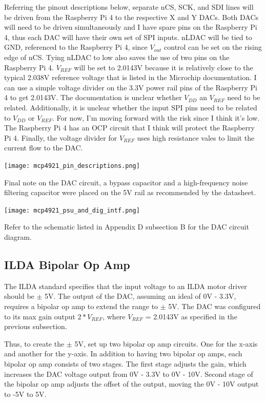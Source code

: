 \documentclass[journal]{IEEEtran}
\begin{document}
    Referring the pinout descriptions below, separate nCS, SCK, and SDI lines will be driven from the Raspberry Pi 4 to the respective X and Y DACs.
    Both DACs will need to be driven simultaneously and I have spare pins on the Raspberry Pi 4, thus each DAC will have their own set of SPI inputs.
    nLDAC will be tied to GND, referenced to the Raspberry Pi 4, since $V_{out}$ control can be set on the rising edge of nCS.
    Tying nLDAC to low also saves the use of two pins on the Raspberry Pi 4.
    $V_{REF}$ will be set to 2.0143V because it is relatively close to the typical 2.038V reference voltage that is listed in the Microchip documentation.
    I can use a simple voltage divider on the 3.3V power rail pins of the Raspberry Pi 4 to get 2.0143V.
    The documentation is unclear whether $V_{DD}$ an $V_{REF}$ need to be related.
    Additionally, it is unclear whether the input SPI pins need to be related to $V_{DD}$ or $V_{REF}$.
    For now, I'm moving forward with the risk since I think it's low.
    The Raspberry Pi 4 has an OCP circuit that I think will protect the Raspberry Pi 4.
    Finally, the voltage divider for $V_{REF}$ uses high resistance vales to limit the current flow to the DAC. \newline

    \texttt{[image: mcp4921\_pin\_descriptions.png]}

    Final note on the DAC circuit, a bypass capacitor and a high-frequency noise filtering capacitor were placed on the 5V rail as recommended by the datasheet. \newline

    \texttt{[image: mcp4921\_psu\_and\_dig\_intf.png]}

    Refer to the schematic listed in Appendix D subsection B for the DAC circuit diagram.
    
    \subsection{ILDA Bipolar Op Amp}

    The ILDA standard specifies that the input voltage to an ILDA motor driver should be $\pm$ 5V.
    The output of the DAC, assuming an ideal of 0V - 3.3V, requires a bipolar op amp to extend the range to $\pm$ 5V.
    The DAC was configured to its max gain output $2 * V_{REF}$, where $V_{REF}$ = 2.0143V as specified in the previous subsection.
    
    Thus, to create the $\pm$ 5V, set up two bipolar op amp circuits.
    One for the x-axis and another for the y-axis.
    In addition to having two bipolar op amps, each bipolar op amp consists of two stages.
    The first stage adjusts the gain, which increases the DAC voltage output from 0V - 3.3V to 0V - 10V.
    Second stage of the bipolar op amp adjusts the offset of the output, moving the 0V - 10V output to -5V to 5V.
\end{document}
